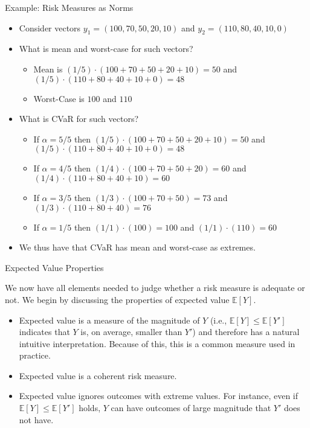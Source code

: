 \documentclass[9pt]{beamer}
\begin{document}
%
\begin{frame}{Example: Risk Measures as Norms}

\begin{itemize}
\setlength{\itemsep}{10pt}
\item Consider vectors $y_1=(100,70,50,20,10)$ and $y_2=(110,80,40,10,0)$

\item What is mean and worst-case for such vectors?
\begin{itemize}
\setlength{\itemsep}{10pt}
\item Mean is $(1/5)\cdot (100+70+50+20+10)=50$ and $(1/5)\cdot(110+80+40+10+0)=48$
\item Worst-Case is $100$ and $110$
\end{itemize}
\item What is CVaR for such vectors? 
\begin{itemize}
\setlength{\itemsep}{10pt}
\item If $\alpha=5/5$ then $(1/5)\cdot (100+70+50+20+10)=50$ and $(1/5)\cdot(110+80+40+10+0)=48$
\item If $\alpha=4/5$ then $(1/4)\cdot (100+70+50+20)=60$ and $(1/4)\cdot(110+80+40+10)=60$
\item If $\alpha=3/5$ then $(1/3)\cdot (100+70+50)=73$ and $(1/3)\cdot(110+80+40)=76$
\item If $\alpha=1/5$ then $(1/1)\cdot (100)=100$ and $(1/1)\cdot(110)=60$
\end{itemize}
\item We thus have that CVaR has mean and worst-case as extremes.
\end{itemize}


\end{frame}

%
\begin{frame}{Expected Value Properties}

We now have all elements needed to judge whether a risk measure is adequate or not.  We begin by discussing the properties of expected value $\mathbb{E}[Y]$.

\begin{itemize}
\setlength{\itemsep}{10pt}
\item Expected value is a measure of the magnitude of $Y$ (i.e., $\mathbb{E}[Y]\leq \mathbb{E}[Y']$ indicates that $Y$ is, on average, smaller than $Y'$) and therefore has a natural intuitive interpretation.  Because of this, this is a common measure used in practice. 

\item Expected value is a coherent risk measure.

\item Expected value ignores outcomes with extreme values. For instance, even if $\mathbb{E}[Y]\leq \mathbb{E}[Y']$ holds, $Y$ can have outcomes of large magnitude that $Y'$ does not have. 

\end{itemize}


\end{frame}
\end{document}
